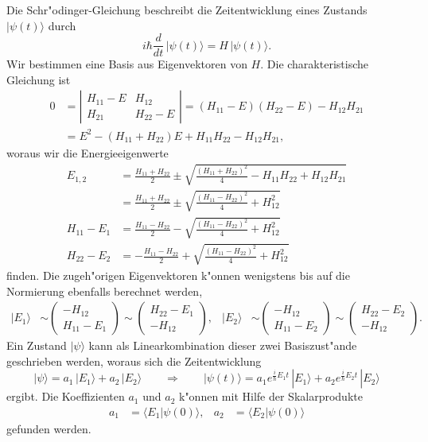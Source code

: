Die Schr"odinger-Gleichung beschreibt die Zeitentwicklung eines
Zustands $|\psi(t)\rangle$ durch
\[
i\hbar\frac{d}{dt}\,|\psi(t)\rangle = H\, |\psi(t)\rangle.
\]
Wir bestimmen eine Basis aus Eigenvektoren von $H$.
Die charakteristische Gleichung ist
\begin{align*}
0&=
\left|\begin{matrix}
H_{11}-E&H_{12}\\
H_{21}&H_{22}-E
\end{matrix}\right|
=
(H_{11}-E)(H_{22}-E)-H_{12}H_{21}
\\
&=
E^2 - (H_{11}+H_{22})E + H_{11}H_{22}-H_{12}H_{21},
\end{align*}
woraus wir die Energieeigenwerte
\begin{align*}
E_{1,2}
&=
\frac{H_{11}+H_{22}}2\pm\sqrt{\frac{(H_{11}+H_{22})^2}4-H_{11}H_{22}+H_{12}H_{21}}
\\
&=
\frac{H_{11}+H_{22}}2\pm\sqrt{\frac{(H_{11}-H_{22})^2}4+H_{12}^2}
\\
H_{11}-E_1
&=
\frac{H_{11}-H_{22}}2-\sqrt{\frac{(H_{11}-H_{22})^2}4+H_{12}^2}
\\
H_{22}-E_2
&=
-\frac{H_{11}-H_{22}}2+\sqrt{\frac{(H_{11}-H_{22})^2}4+H_{12}^2}
\end{align*}
finden.
Die zugeh"origen Eigenvektoren k"onnen wenigstens bis auf die Normierung
ebenfalls berechnet werden,
\begin{align*}
|E_1\rangle
&\sim
\begin{pmatrix}
  -H_{12} \\
H_{11}-E_1
\end{pmatrix}
\sim
\begin{pmatrix}
H_{22}-E_1 \\
   -H_{12}
\end{pmatrix},
&
|E_2\rangle
&\sim
\begin{pmatrix}
   -H_{12} \\
H_{11}-E_2
\end{pmatrix}
\sim
\begin{pmatrix}
H_{22}-E_2 \\
   -H_{12}
\end{pmatrix}.
\end{align*} 
Ein Zustand $|\psi\rangle$ kann als Linearkombination dieser zwei
Basiszust"ande geschrieben werden, woraus sich die Zeitentwicklung
\[
|\psi\rangle
=
a_1\,|E_1\rangle
+
a_2\,|E_2\rangle
\qquad\Rightarrow\qquad
|\psi(t)\rangle
=
a_1e^{\frac{i}{\hbar}E_1t}\,|E_1\rangle
+
a_2e^{\frac{i}{\hbar}E_2t}\,|E_2\rangle
\]
ergibt.
Die Koeffizienten $a_1$ und $a_2$ k"onnen mit Hilfe der Skalarprodukte
\begin{align*}
a_1&=\langle E_1|\psi(0)\rangle,
&
a_2&=\langle E_2|\psi(0)\rangle
\end{align*}
gefunden werden.


